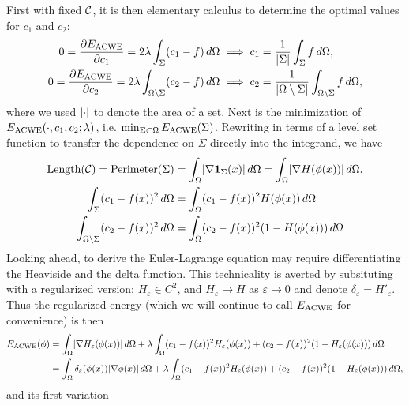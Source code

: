 First with fixed $\mathcal{C}$, it is then elementary calculus to determine the optimal values for $c_1$ and $c_2$: 
\begin{align}
0 = \frac{\partial E_\textrm{ACWE}}{\partial c_1}  = 2\lambda \int_{\Sigma} (c_1 - f ) \,d\Omega
&\implies 
c_1 = \frac{1}{\lvert\Sigma\rvert} \int_{\Sigma} f \,d\Omega,
\label{eq:c1}
\\
0 = \frac{\partial E_\textrm{ACWE}}{\partial c_2}  = 2\lambda \int_{\Omega\setminus \Sigma} (c_2 - f )\,d\Omega
&\implies 
c_2 = \frac{1}{\lvert\Omega\setminus\Sigma\rvert} \int_{\Omega\setminus \Sigma} f \,d\Omega,
\label{eq:c2}
\end{align}
where we used $\lvert\cdot\rvert$ to denote the area of a set. Next is the minimization of $E_\textrm{ACWE}(\cdot, c_1, c_2; \lambda)$, i.e. $\min_{\Sigma \subset \Omega} E_\textrm{ACWE}(\Sigma)$. Rewriting in terms of a level set function to transfer the dependence on $\Sigma$ directly into the integrand, we have 
\begin{align}
\textrm{Length}(\mathcal{C}) 
= \textrm{Perimeter}(\Sigma) 
&= \int_{\Omega} \lvert\nabla \mathbf{1}_\Sigma(x)\rvert \,d\Omega
= \int_{\Omega} \lvert \nabla H(\phi(x)) \rvert \,d\Omega,
\label{eacwe1}
\\
\int_{\Sigma} (c_1 - f(x) )^2 \, d\Omega 
&= \int_{\Omega} (c_1 - f(x))^2 H(\phi(x)) \, d\Omega
\\
\int_{\Omega\setminus\Sigma} (c_2 - f(x))^2 \,d\Omega 
&=
\int_{\Omega} (c_2 - f(x))^2 (1 - H(\phi(x))) \,d\Omega
\end{align}
Looking ahead, to derive the Euler-Lagrange equation may require differentiating the Heaviside and the delta function. This technicality is averted by subsituting with a regularized version: $H_\varepsilon \in C^2$, and $H_\varepsilon \rightarrow H$ as $\varepsilon\rightarrow 0$ and denote $\delta_\varepsilon = H'_\varepsilon$. Thus the regularized energy (which we will continue to call $E_\textrm{ACWE}$ for convenience) is then 
\begin{align*}
E_\textrm{ACWE}(\phi) 
&= \int_{\Omega } \lvert\nabla H_\varepsilon(\phi(x))\rvert \,d\Omega 
+ \lambda\int_{\Omega} (c_1 - f(x))^2 H_\varepsilon(\phi(x)) 
+ (c_2 - f(x))^2 (1 - H_\varepsilon(\phi(x))) \,d\Omega
\\
&= \int_{\Omega } \delta_\varepsilon(\phi(x)) \lvert\nabla \phi(x)\rvert \,d\Omega 
+ \lambda\int_{\Omega} (c_1 - f(x))^2 H_\varepsilon(\phi(x)) 
+ (c_2 - f(x))^2 (1 - H_\varepsilon(\phi(x))) \,d\Omega,
\end{align*}
and its first variation

